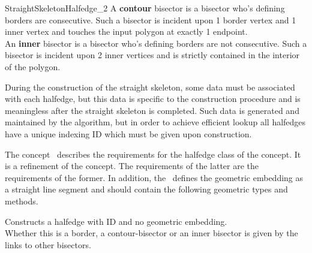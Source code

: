 \begin{ccRefConcept}{StraightSkeletonHalfedge_2}
A \textbf{contour} bisector is a bisector who's defining borders are consecutive. Such a bisector is incident upon 1 border vertex and 1 inner vertex and touches the input polygon at exactly 1 endpoint.\\
An \textbf{inner} bisector is a bisector who's defining borders are not consecutive. Such a bisector is incident upon 2 inner vertices and is strictly contained in the interior of the polygon.

During the construction of the straight skeleton, some data must be associated with each halfedge, but this data is specific to the construction procedure and is meaningless after the straight skeleton is completed. Such data is generated and maintained by the algorithm, but in order to achieve efficient lookup all halfedges have a unique indexing ID which must be given upon construction.

\ccDefinition

The concept \ccRefName\ describes the
requirements for the halfedge class of the
 concept. It is a refinement of the
 concept.
The requirements of the latter are the requirements of the former.
In addition, the \ccRefName\ defines the geometric embedding as a straight line segment
and should contain the following geometric types and methods.

\ccTypes

\ccCreation
{}  %


{Constructs a halfedge with ID  and no geometric embedding.\\
Whether this is a border, a contour-bisector or an inner bisector is given by the links to other bisectors.}

\ccAccessFunctions
  \ccGlue
  \ccGlue


\end{ccRefConcept}
